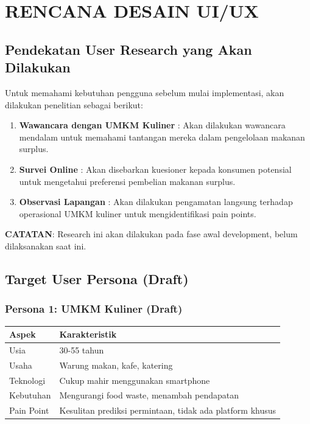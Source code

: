\section{RENCANA DESAIN UI/UX}

\subsection{Pendekatan User Research yang Akan Dilakukan}

Untuk memahami kebutuhan pengguna sebelum mulai implementasi, akan dilakukan penelitian sebagai berikut:

\begin{enumerate}[leftmargin=*]
    \item \textbf{Wawancara dengan UMKM Kuliner} : Akan dilakukan wawancara mendalam untuk memahami tantangan mereka dalam pengelolaan makanan surplus.
    
    \item \textbf{Survei Online} : Akan disebarkan kuesioner kepada konsumen potensial untuk mengetahui preferensi pembelian makanan surplus.
    
    \item \textbf{Observasi Lapangan} : Akan dilakukan pengamatan langsung terhadap operasional UMKM kuliner untuk mengidentifikasi pain points.
\end{enumerate}

\textbf{CATATAN}: Research ini akan dilakukan pada fase awal development, belum dilaksanakan saat ini.

\subsection{Target User Persona (Draft)}

\subsubsection{Persona 1: UMKM Kuliner (Draft)}
\begin{table}[H]
\centering
\begin{tabularx}{0.8\textwidth}{|l|X|}
\hline
\textbf{Aspek} & \textbf{Karakteristik} \\
\hline
Usia & 30-55 tahun \\
\hline
Usaha & Warung makan, kafe, katering \\
\hline
Teknologi & Cukup mahir menggunakan smartphone \\
\hline
Kebutuhan & Mengurangi food waste, menambah pendapatan \\
\hline
Pain Point & Kesulitan prediksi permintaan, tidak ada platform khusus \\
\hline
\end{tabularx}
\end{table}

